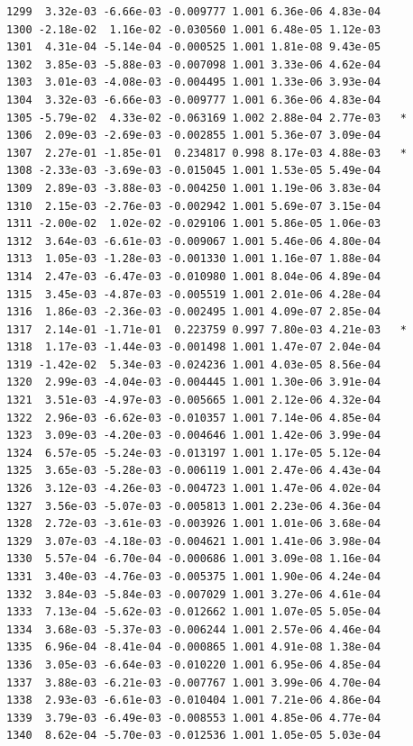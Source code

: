 \documentclass[
  letterpaper,
  DIV=11,
  numbers=noendperiod]{scrartcl}
\begin{document}
\begin{verbatim}
1299  3.32e-03 -6.66e-03 -0.009777 1.001 6.36e-06 4.83e-04    
1300 -2.18e-02  1.16e-02 -0.030560 1.001 6.48e-05 1.12e-03    
1301  4.31e-04 -5.14e-04 -0.000525 1.001 1.81e-08 9.43e-05    
1302  3.85e-03 -5.88e-03 -0.007098 1.001 3.33e-06 4.62e-04    
1303  3.01e-03 -4.08e-03 -0.004495 1.001 1.33e-06 3.93e-04    
1304  3.32e-03 -6.66e-03 -0.009777 1.001 6.36e-06 4.83e-04    
1305 -5.79e-02  4.33e-02 -0.063169 1.002 2.88e-04 2.77e-03   *
1306  2.09e-03 -2.69e-03 -0.002855 1.001 5.36e-07 3.09e-04    
1307  2.27e-01 -1.85e-01  0.234817 0.998 8.17e-03 4.88e-03   *
1308 -2.33e-03 -3.69e-03 -0.015045 1.001 1.53e-05 5.49e-04    
1309  2.89e-03 -3.88e-03 -0.004250 1.001 1.19e-06 3.83e-04    
1310  2.15e-03 -2.76e-03 -0.002942 1.001 5.69e-07 3.15e-04    
1311 -2.00e-02  1.02e-02 -0.029106 1.001 5.86e-05 1.06e-03    
1312  3.64e-03 -6.61e-03 -0.009067 1.001 5.46e-06 4.80e-04    
1313  1.05e-03 -1.28e-03 -0.001330 1.001 1.16e-07 1.88e-04    
1314  2.47e-03 -6.47e-03 -0.010980 1.001 8.04e-06 4.89e-04    
1315  3.45e-03 -4.87e-03 -0.005519 1.001 2.01e-06 4.28e-04    
1316  1.86e-03 -2.36e-03 -0.002495 1.001 4.09e-07 2.85e-04    
1317  2.14e-01 -1.71e-01  0.223759 0.997 7.80e-03 4.21e-03   *
1318  1.17e-03 -1.44e-03 -0.001498 1.001 1.47e-07 2.04e-04    
1319 -1.42e-02  5.34e-03 -0.024236 1.001 4.03e-05 8.56e-04    
1320  2.99e-03 -4.04e-03 -0.004445 1.001 1.30e-06 3.91e-04    
1321  3.51e-03 -4.97e-03 -0.005665 1.001 2.12e-06 4.32e-04    
1322  2.96e-03 -6.62e-03 -0.010357 1.001 7.14e-06 4.85e-04    
1323  3.09e-03 -4.20e-03 -0.004646 1.001 1.42e-06 3.99e-04    
1324  6.57e-05 -5.24e-03 -0.013197 1.001 1.17e-05 5.12e-04    
1325  3.65e-03 -5.28e-03 -0.006119 1.001 2.47e-06 4.43e-04    
1326  3.12e-03 -4.26e-03 -0.004723 1.001 1.47e-06 4.02e-04    
1327  3.56e-03 -5.07e-03 -0.005813 1.001 2.23e-06 4.36e-04    
1328  2.72e-03 -3.61e-03 -0.003926 1.001 1.01e-06 3.68e-04    
1329  3.07e-03 -4.18e-03 -0.004621 1.001 1.41e-06 3.98e-04    
1330  5.57e-04 -6.70e-04 -0.000686 1.001 3.09e-08 1.16e-04    
1331  3.40e-03 -4.76e-03 -0.005375 1.001 1.90e-06 4.24e-04    
1332  3.84e-03 -5.84e-03 -0.007029 1.001 3.27e-06 4.61e-04    
1333  7.13e-04 -5.62e-03 -0.012662 1.001 1.07e-05 5.05e-04    
1334  3.68e-03 -5.37e-03 -0.006244 1.001 2.57e-06 4.46e-04    
1335  6.96e-04 -8.41e-04 -0.000865 1.001 4.91e-08 1.38e-04    
1336  3.05e-03 -6.64e-03 -0.010220 1.001 6.95e-06 4.85e-04    
1337  3.88e-03 -6.21e-03 -0.007767 1.001 3.99e-06 4.70e-04    
1338  2.93e-03 -6.61e-03 -0.010404 1.001 7.21e-06 4.86e-04    
1339  3.79e-03 -6.49e-03 -0.008553 1.001 4.85e-06 4.77e-04    
1340  8.62e-04 -5.70e-03 -0.012536 1.001 1.05e-05 5.03e-04    

\end{verbatim}
\end{document}
